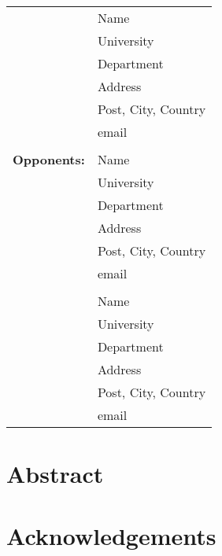 \documentclass[12pt]{book}
\begin{document}
\begin{tabular}{@{}p{4cm}p{10cm}@{}}
 						& Name \\
                  		& University \\
                  		& Department \\
                  		& Address\\
						& Post, City, Country \\
						& email\\ \\
						
\textbf{Opponents:}     & Name \\
                  		& University \\
                  		& Department \\
                  		& Address\\
						& Post, City, Country \\
						& email\\ \\
						
						& Name \\
						& University \\
                  		& Department \\
                  		& Address\\
						& Post, City, Country \\
						& email
\end{tabular}
\thispagestyle{empty}

\chapter*{Abstract}


\chapter*{Acknowledgements}

\tableofcontents

\listoffigures
{}

\listoftables
{}














\renewcommand{\bibname}{References}





\end{document}
